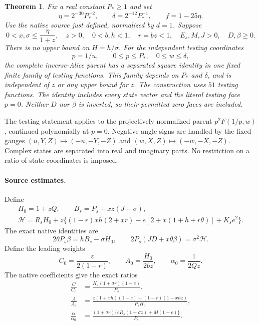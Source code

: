 \documentclass[11pt]{article}
\newtheorem{theorem}{Theorem}
\begin{document}
\begin{theorem}\label{thm:allz}
Fix a real constant $P_*\ge1$ and set
\[
 \eta=2^{-30}P_*^{-2},\qquad
 \delta=2^{-12}P_*^{-1},\qquad f=1-25\eta.
\]
Use the native source just defined, normalized by $d=1$. Suppose
\begin{equation}\label{eq:domain}
 0<x,\sigma\le\frac\eta{1+z},\quad z>0,\quad
 0<b,h<1,\quad r=bz<1,\quad E_s,M,J>0,\quad D,\beta\ge0.
\end{equation}
There is no upper bound on $H=h/\sigma$. For the independent testing
coordinates
\[
 p=1/u,\qquad 0\le p\le P_*,\quad 0\le w\le\delta,
\]
the complete inverse-Alice parent has a separated square identity in
one fixed finite family of testing functions. This family depends on
$P_*$ and $\delta$, and is independent of $z$ or any upper bound for
$z$. The construction uses $51$ testing functions. The identity
includes every state vector and the literal testing face $p=0$.
Neither $D$ nor $\beta$ is inverted, so their permitted zero faces
are included.
\end{theorem}

The testing statement applies to the projectively normalized parent
$p^2F(1/p,w)$, continued polynomially at $p=0$. Negative angle signs
are handled by the fixed gauges
$(u,Y,Z)\mapsto(-u,-Y,-Z)$ and
$(w,X,Z)\mapsto(-w,-X,-Z)$. Complex states are separated into real
and imaginary parts. No restriction on a ratio of state coordinates
is imposed.

\paragraph{Source estimates.}
Define
\begin{gather*}
 H_0=1+zQ,\qquad B_s=P_s+xz(J-\sigma),\\
 \mathcal H=R_sH_0+z\{(1-r)xh(2+xr)
                  -e[2+x(1+h+r\theta)]+K_s e^2\}.
\end{gather*}
The exact native identities are
\begin{equation}\label{eq:BE}
 2\theta P_s\beta=hB_s-\sigma H_0,\qquad
 2P_s(JD+x\theta\beta)=\sigma^2\mathcal H.
\end{equation}
Define the leading weights
\begin{equation}\label{eq:leadingweights}
 C_0=\frac{z}{2(1-r)},\qquad
 A_0=\frac{H_0}{2bz},\qquad
 \alpha_0=\frac1{2Qz}.
\end{equation}
The native coefficients give the exact ratios
\begin{align}
 \frac C{C_0}&=\frac{K_s(1+\sigma r)(1-e)}{P_s},\label{eq:ratioC}\\
 \frac A{A_0}&=
 \frac{z(1+xh)(1-e)+(1-r)(1+xhz)}{P_sH_0},\label{eq:ratioA}\\
 \frac\alpha{\alpha_0}&=
 \frac{(1+\sigma r)\{eR_s(1+\sigma z)+M(1-e)\}}{P_s}.
 \label{eq:ratioalpha}
\end{align}
\end{document}
